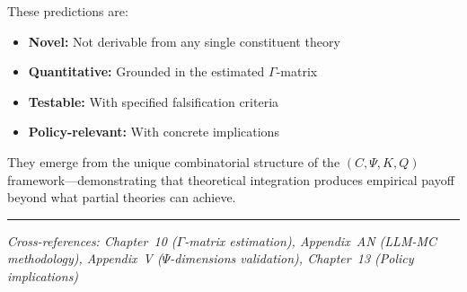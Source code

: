 These predictions are:
\begin{itemize}
  \item \textbf{Novel:} Not derivable from any single constituent theory
  \item \textbf{Quantitative:} Grounded in the estimated $\Gamma$-matrix
  \item \textbf{Testable:} With specified falsification criteria
  \item \textbf{Policy-relevant:} With concrete implications
\end{itemize}

They emerge from the unique combinatorial structure of the $(C, \Psi, K, Q)$ 
framework---demonstrating that theoretical integration produces empirical 
payoff beyond what partial theories can achieve.

\vspace{1em}
\hrule
\vspace{0.5em}
\noindent\textit{Cross-references: Chapter~10 ($\Gamma$-matrix estimation), 
Appendix~AN (LLM-MC methodology), 
Appendix~V ($\Psi$-dimensions validation),
Chapter~13 (Policy implications)}

